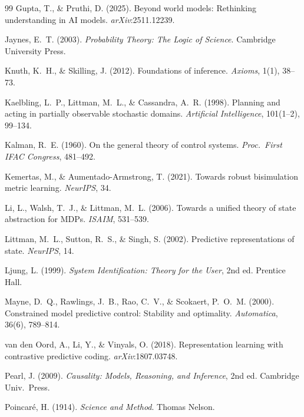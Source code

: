 \documentclass[10pt,twocolumn]{article}
\theoremstyle{plain}
\theoremstyle{definition}
\theoremstyle{remark}
\begin{document}
\begin{thebibliography}{99}
Gupta, T., \& Pruthi, D. (2025).
Beyond world models: Rethinking understanding in AI models.
\textit{arXiv}:2511.12239.

Jaynes, E.~T. (2003).
\textit{Probability Theory: The Logic of Science}.
Cambridge University Press.

Knuth, K.~H., \& Skilling, J. (2012).
Foundations of inference.
\textit{Axioms}, 1(1), 38--73.

Kaelbling, L.~P., Littman, M.~L., \& Cassandra, A.~R. (1998).
Planning and acting in partially observable stochastic domains.
\textit{Artificial Intelligence}, 101(1--2), 99--134.

Kalman, R.~E. (1960).
On the general theory of control systems.
\textit{Proc.\ First IFAC Congress}, 481--492.

Kemertas, M., \& Aumentado-Armstrong, T. (2021).
Towards robust bisimulation metric learning.
\textit{NeurIPS}, 34.

Li, L., Walsh, T.~J., \& Littman, M.~L. (2006).
Towards a unified theory of state abstraction for MDPs.
\textit{ISAIM}, 531--539.

Littman, M.~L., Sutton, R.~S., \& Singh, S. (2002).
Predictive representations of state.
\textit{NeurIPS}, 14.

Ljung, L. (1999).
\textit{System Identification: Theory for the User}, 2nd ed.
Prentice Hall.

Mayne, D.~Q., Rawlings, J.~B., Rao, C.~V., \& Scokaert, P.~O.~M. (2000).
Constrained model predictive control: Stability and optimality.
\textit{Automatica}, 36(6), 789--814.

van den Oord, A., Li, Y., \& Vinyals, O. (2018).
Representation learning with contrastive predictive coding.
\textit{arXiv}:1807.03748.

Pearl, J. (2009).
\textit{Causality: Models, Reasoning, and Inference}, 2nd ed.
Cambridge Univ.\ Press.

Poincar\'e, H. (1914).
\textit{Science and Method}.
Thomas Nelson.


\end{thebibliography}
\end{document}
